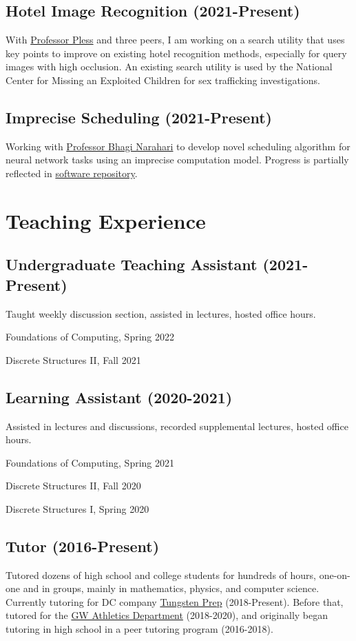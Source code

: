 \documentclass[letterpaper]{article}
\renewenvironment{itemize}{
  \begin{list}{}{
    \setlength{\leftmargin}{1.5em}
  }
}{
  \end{list}
}
\begin{document}
\subsection*{Hotel Image Recognition (2021-Present)}
With \href{https://www2.seas.gwu.edu/~pless/}{Professor Pless} and three peers, I am working
on a search utility that uses key points to improve on existing hotel recognition methods,
especially for query images with high occlusion.
An existing search utility is used by the National Center for Missing an Exploited Children
for sex trafficking investigations.

\subsection*{Imprecise Scheduling (2021-Present)}
Working with \href{https://www2.seas.gwu.edu/~narahari/}{Professor Bhagi Narahari} to 
develop novel scheduling algorithm for neural network tasks using an imprecise computation
model. Progress is partially reflected in 
\href{https://github.com/obroadrick/imprecise}{software repository}.

\section*{Teaching Experience}
\subsection*{Undergraduate Teaching Assistant (2021-Present)}
Taught weekly discussion section, assisted in lectures, hosted office hours.
\begin{itemize}
\item
Foundations of Computing, Spring 2022
\item
Discrete Structures II, Fall 2021
\end{itemize}
\subsection*{Learning Assistant (2020-2021)}
Assisted in lectures and discussions, recorded supplemental lectures, hosted office hours.
\begin{itemize}
\item
Foundations of Computing, Spring 2021
\item
Discrete Structures II, Fall 2020
\item
Discrete Structures I, Spring 2020
\end{itemize}
\subsection*{Tutor (2016-Present)}
Tutored dozens of high school and college students for hundreds of hours, one-on-one and in groups, mainly in mathematics, physics, and computer science. Currently tutoring for DC company \href{https://www.tungstenprep.com/}{Tungsten Prep} (2018-Present). Before that, tutored for the \href{https://gwsports.com/sports/2018/7/23/school-bio-academic-support-tutor-info-html.aspx}{GW Athletics Department} (2018-2020), and originally began tutoring in high school in a peer tutoring program (2016-2018).
\end{document}
